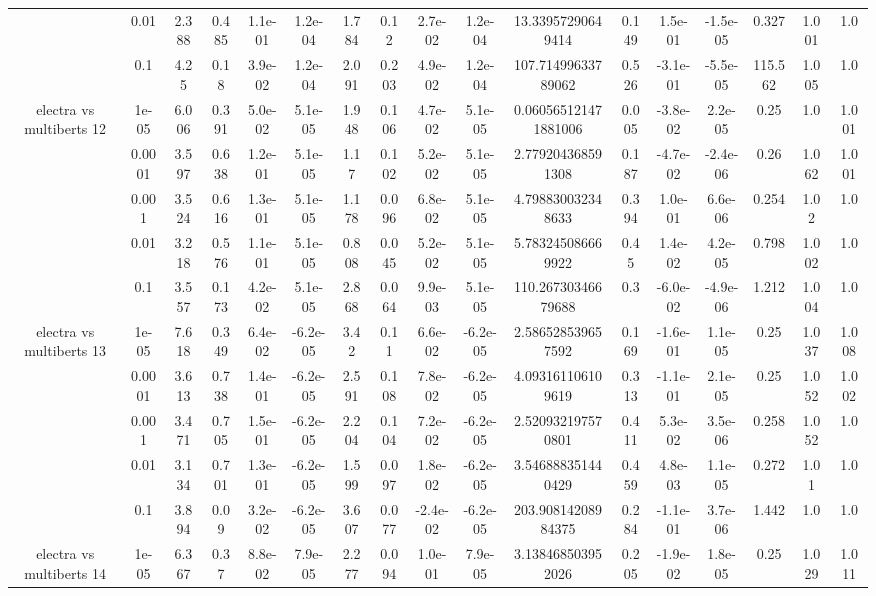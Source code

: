 \begin{tabular}{|c|c|c|c|c|c|c|c|c|c|c|c|c|c|c|c|c|}
 & 0.01 & 2.388 & 0.485 & 1.1e-01 & 1.2e-04 & 1.784 & 0.12 & 2.7e-02 & 1.2e-04 & 13.33957290649414 & 0.149 & 1.5e-01 & -1.5e-05 & 0.327 & 1.001 & 1.0 \\
 & 0.1 & 4.25 & 0.18 & 3.9e-02 & 1.2e-04 & 2.091 & 0.203 & 4.9e-02 & 1.2e-04 & 107.71499633789062 & 0.526 & -3.1e-01 & -5.5e-05 & 115.562 & 1.005 & 1.0 \\
\hline
\multirow{5}{*}{electra  vs multiberts 12} & 1e-05 & 6.006 & 0.391 & 5.0e-02 & 5.1e-05 & 1.948 & 0.106 & 4.7e-02 & 5.1e-05 & 0.060565121471881006 & 0.005 & -3.8e-02 & 2.2e-05 & 0.25 & 1.0 & 1.001 \\
 & 0.0001 & 3.597 & 0.638 & 1.2e-01 & 5.1e-05 & 1.17 & 0.102 & 5.2e-02 & 5.1e-05 & 2.779204368591308 & 0.187 & -4.7e-02 & -2.4e-06 & 0.26 & 1.062 & 1.001 \\
 & 0.001 & 3.524 & 0.616 & 1.3e-01 & 5.1e-05 & 1.178 & 0.096 & 6.8e-02 & 5.1e-05 & 4.798830032348633 & 0.394 & 1.0e-01 & 6.6e-06 & 0.254 & 1.02 & 1.0 \\
 & 0.01 & 3.218 & 0.576 & 1.1e-01 & 5.1e-05 & 0.808 & 0.045 & 5.2e-02 & 5.1e-05 & 5.783245086669922 & 0.45 & 1.4e-02 & 4.2e-05 & 0.798 & 1.002 & 1.0 \\
 & 0.1 & 3.557 & 0.173 & 4.2e-02 & 5.1e-05 & 2.868 & 0.064 & 9.9e-03 & 5.1e-05 & 110.26730346679688 & 0.3 & -6.0e-02 & -4.9e-06 & 1.212 & 1.004 & 1.0 \\
\hline
\multirow{5}{*}{electra  vs multiberts 13} & 1e-05 & 7.618 & 0.349 & 6.4e-02 & -6.2e-05 & 3.42 & 0.11 & 6.6e-02 & -6.2e-05 & 2.586528539657592 & 0.169 & -1.6e-01 & 1.1e-05 & 0.25 & 1.037 & 1.008 \\
 & 0.0001 & 3.613 & 0.738 & 1.4e-01 & -6.2e-05 & 2.591 & 0.108 & 7.8e-02 & -6.2e-05 & 4.093161106109619 & 0.313 & -1.1e-01 & 2.1e-05 & 0.25 & 1.052 & 1.002 \\
 & 0.001 & 3.471 & 0.705 & 1.5e-01 & -6.2e-05 & 2.204 & 0.104 & 7.2e-02 & -6.2e-05 & 2.520932197570801 & 0.411 & 5.3e-02 & 3.5e-06 & 0.258 & 1.052 & 1.0 \\
 & 0.01 & 3.134 & 0.701 & 1.3e-01 & -6.2e-05 & 1.599 & 0.097 & 1.8e-02 & -6.2e-05 & 3.546888351440429 & 0.459 & 4.8e-03 & 1.1e-05 & 0.272 & 1.01 & 1.0 \\
 & 0.1 & 3.894 & 0.09 & 3.2e-02 & -6.2e-05 & 3.607 & 0.077 & -2.4e-02 & -6.2e-05 & 203.90814208984375 & 0.284 & -1.1e-01 & 3.7e-06 & 1.442 & 1.0 & 1.0 \\
\hline
\multirow{5}{*}{electra  vs multiberts 14} & 1e-05 & 6.367 & 0.37 & 8.8e-02 & 7.9e-05 & 2.277 & 0.094 & 1.0e-01 & 7.9e-05 & 3.138468503952026 & 0.205 & -1.9e-02 & 1.8e-05 & 0.25 & 1.029 & 1.011 \\

\end{tabular}
